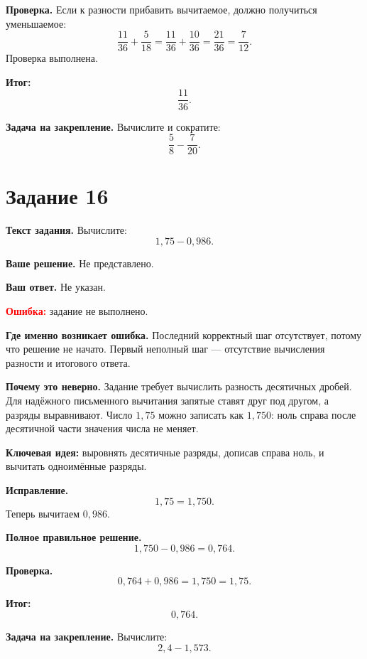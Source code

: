 \documentclass[12pt,a4paper]{article}
\begin{document}
\textbf{Проверка.}
Если к разности прибавить вычитаемое, должно получиться уменьшаемое:
\[
\frac{11}{36}+\frac{5}{18}
=\frac{11}{36}+\frac{10}{36}
=\frac{21}{36}
=\frac{7}{12}.
\]
Проверка выполнена.

\textcolor{teal!60!black}{\textbf{Итог:}}
\[
\boxed{\frac{11}{36}}.
\]

\textbf{Задача на закрепление.}
Вычислите и сократите:
\[
\frac58-\frac{7}{20}.
\]

\newpage
{}\label{task:16}
\section*{Задание 16}

\textbf{Текст задания.}
Вычислите:
\[
1{,}75-0{,}986.
\]

\textbf{Ваше решение.}
Не представлено.

\textbf{Ваш ответ.}
Не указан.

\textcolor{red}{\textbf{Ошибка:}} задание не выполнено.

\textbf{Где именно возникает ошибка.}
Последний корректный шаг отсутствует, потому что решение не начато. Первый неполный шаг --- отсутствие вычисления разности и итогового ответа.

\textbf{Почему это неверно.}
Задание требует вычислить разность десятичных дробей. Для надёжного письменного вычитания запятые ставят друг под другом, а разряды выравнивают. Число $1{,}75$ можно записать как $1{,}750$: ноль справа после десятичной части значения числа не меняет.

\textcolor{blue!60!black}{\textbf{Ключевая идея:}} выровнять десятичные разряды, дописав справа ноль, и вычитать одноимённые разряды.

\textbf{Исправление.}
\[
1{,}75=1{,}750.
\]
Теперь вычитаем $0{,}986$.

\textbf{Полное правильное решение.}
\[
1{,}750-0{,}986=0{,}764.
\]

\textbf{Проверка.}
\[
0{,}764+0{,}986=1{,}750=1{,}75.
\]

\textcolor{teal!60!black}{\textbf{Итог:}}
\[
\boxed{0{,}764}.
\]

\textbf{Задача на закрепление.}
Вычислите:
\[
2{,}4-1{,}573.
\]

\newpage
{}\label{task:17}
\end{document}
